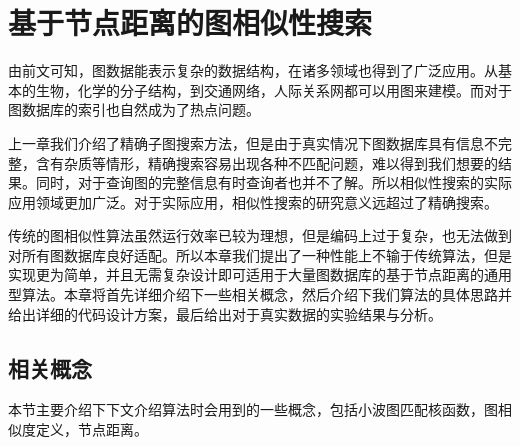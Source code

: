 \documentclass{XDBAthesis}
\begin{document}
\else
\fi
\chapter{基于节点距离的图相似性搜索}
\label{chap:gHash}
由前文可知，图数据能表示复杂的数据结构，在诸多领域也得到了广泛应用。从基本的生物，化学的分子结构，到交通网络，人际关系网都可以用图来建模。而对于图数据库的索引也自然成为了热点问题。

上一章我们介绍了精确子图搜索方法，但是由于真实情况下图数据库具有信息不完整，含有杂质等情形，精确搜索容易出现各种不匹配问题，难以得到我们想要的结果。同时，对于查询图的完整信息有时查询者也并不了解。所以相似性搜索的实际应用领域更加广泛。对于实际应用，相似性搜索的研究意义远超过了精确搜索。

传统的图相似性算法虽然运行效率已较为理想，但是编码上过于复杂，也无法做到对所有图数据库良好适配。所以本章我们提出了一种性能上不输于传统算法，但是实现更为简单，并且无需复杂设计即可适用于大量图数据库的基于节点距离的通用型算法。本章将首先详细介绍下一些相关概念，然后介绍下我们算法的具体思路并给出详细的代码设计方案，最后给出对于真实数据的实验结果与分析。
\section{相关概念}
本节主要介绍下下文介绍算法时会用到的一些概念，包括小波图匹配核函数，图相似度定义，节点距离。
\end{document}
